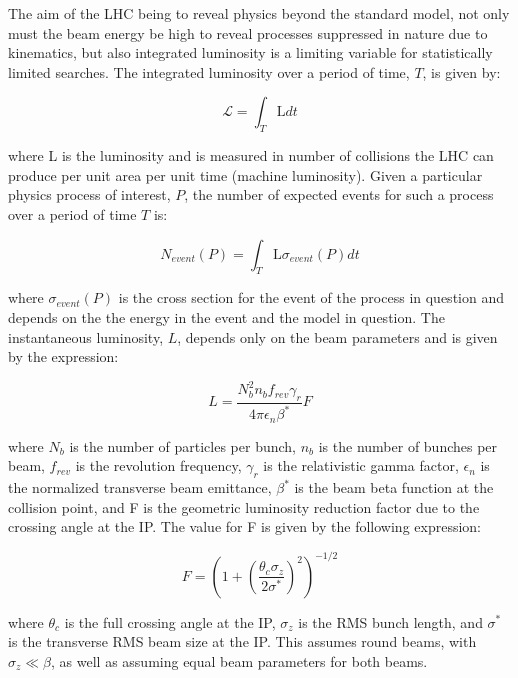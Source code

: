 The aim of the LHC being to reveal physics beyond the standard model, not only must the beam energy be high to reveal processes suppressed in nature due to kinematics, but also integrated luminosity is a limiting variable for statistically limited searches.  The integrated luminosity over a period of time, $T$, is given by:

\begin{equation}
\mathcal{L} = \int_{T}{\text{L} dt}
\label{eq:IntLuminosity}
\end{equation}

where L is the luminosity and is measured in number of collisions the LHC can produce per unit area per unit time (machine luminosity).  Given a particular physics process of interest, $P$, the number of expected events for such a process over a period of time $T$ is:

\begin{equation}
N_{event}(P) = \int_{T}{\text{L} \sigma_{event}(P) dt}
\label{eq:NumEvents}
\end{equation}

where $\sigma_{event}(P)$ is the cross section for the event of the process in question and depends on the the energy in the event and the model in question.  The instantaneous luminosity, $L$, depends only on the beam parameters and is given by the expression:


\begin{equation}
L = \frac{N^2_b n_b f_{rev} \gamma_r}{4 \pi \epsilon_n \beta^*} F
\label{eq:InstLuminosity}
\end{equation}

where $N_b$ is the number of particles per bunch, $n_b$ is the number of bunches per beam, $f_{rev}$ is the revolution frequency, $\gamma_r$ is the relativistic gamma factor, $\epsilon_n$ is the normalized transverse beam emittance, $\beta^*$ is the beam beta function at the collision point, and F is the geometric luminosity reduction factor due to the crossing angle at the IP.  The value for F is given by the following expression:


\begin{equation}
F = \left(1+\left(\frac{\theta_c \sigma_z}{2 \sigma^*}\right)^2\right)^{-1/2}
\label{eq:BeamF}
\end{equation}

where $\theta_c$ is the full crossing angle at the IP, $\sigma_z$ is the RMS bunch length, and $\sigma^*$ is the transverse RMS beam size at the IP.  This assumes round beams, with $\sigma_z \ll \beta$, as well as assuming equal beam parameters for both beams.  

